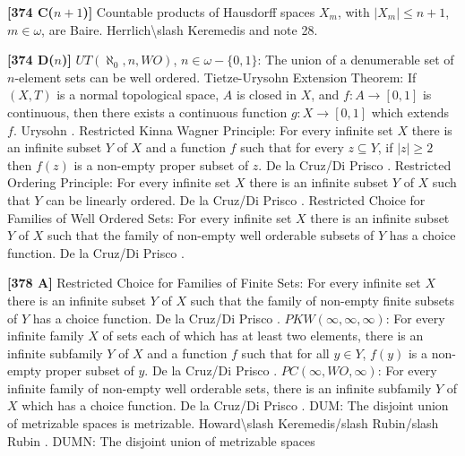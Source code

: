 \smallskip
\item{}{\bf [374 C($n+1$)]} Countable products of Hausdorff spaces $X_m$,
with $|X_m|\leq n+1$, $m\in\omega$, are Baire. \ac{Herrlich\slash Keremedis}
\cite{1999b} and note 28.
\smallskip
\item{}{\bf [374 D($n$)]} $UT(\aleph_0,n,WO)$, $n\in\omega-\{0,1\}$:
The union of a denumerable set of $n$-element sets can be well ordered.
\medskip
{} Tietze-Urysohn Extension Theorem: If
$(X,T)$ is a normal topological space, $A$ is closed in $X$, and
$f: A\to [0,1]$ is continuous, then there exists a continuous
function $g: X\to [0,1]$ which extends $f$. \ac{Urysohn} \cite{1924}.
\medskip
{} Restricted Kinna Wagner Principle:  For every
infinite set $X$ there is an infinite subset $Y$ of $X$ and a function
$f$ such that for every $z\subseteq Y$, if $|z| \ge 2$ then $f(z)$
is a non-empty proper subset of $z$.  De la Cruz/Di \ac{Prisco}
\cite{1998a}.
\medskip
{} Restricted Ordering Principle:  For every
infinite set $X$ there is an infinite subset $Y$ of $X$ such that $Y$
can be linearly ordered.  De la Cruz/Di \ac{Prisco} \cite{1998a}.
\medskip
{} Restricted Choice for Families of Well Ordered
Sets:  For every infinite set $X$ there is an infinite subset $Y$ of
$X$ such that the family of non-empty well orderable subsets of $Y$
has a choice function.  De la Cruz/Di \ac{Prisco} \cite{1998a}.
\smallskip
\item{}{\bf [378 A]} Restricted Choice for Families of Finite Sets:
For every infinite set $X$ there is an infinite subset $Y$ of
$X$ such that the family of non-empty finite subsets of $Y$
has a choice function.  De la Cruz/Di \ac{Prisco} \cite{1998a}.
\medskip
{} $PKW(\infty,\infty,\infty)$: For every infinite
family $X$ of sets each of which has at least two elements, there
is an infinite subfamily $Y$ of $X$ and a function $f$ such that
for all $y\in Y$, $f(y)$ is a non-empty proper subset of $y$.
De la Cruz/Di \ac{Prisco} \cite{1998a}.
\medskip
{} $PC(\infty,WO,\infty)$:  For every infinite
family of non-empty well orderable sets, there is an infinite subfamily $Y$
of $X$ which has a choice function.  De la Cruz/Di \ac{Prisco} \cite{1998a}.
\medskip
{} DUM:  The disjoint union of metrizable spaces
is metrizable. \ac{Howard\slash Keremedis/slash Rubin/slash Rubin}
\cite{1998b}.
\medskip
{} DUMN:  The disjoint union of metrizable spaces
